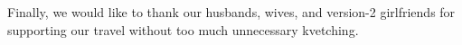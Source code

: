 \documentclass[a4paper,UKenglish]{lipics-v2016}
\begin{document}
Finally, we would like to thank our husbands, wives, and version-2 girlfriends for supporting our travel without too much unnecessary kvetching. 








%

\end{document}
